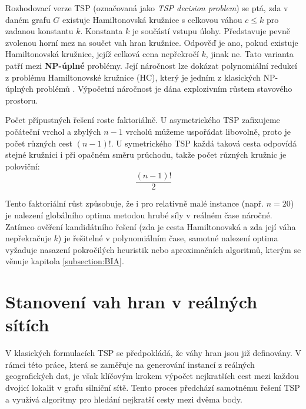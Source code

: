 Rozhodovací verze TSP (označovaná jako \textit{TSP decision problem}) se ptá, zda v daném grafu $G$ existuje Hamiltonovská kružnice s celkovou váhou $c \leq k$ pro zadanou konstantu $k$. Konstanta $k$ je součástí vstupu úlohy. Představuje pevně zvolenou horní mez na součet vah hran kružnice. Odpověď je ano, pokud existuje Hamiltonovská kružnice, jejíž celková cena nepřekročí $k$, jinak ne. Tato varianta patří mezi \textbf{NP-úplné} problémy. Její náročnost lze dokázat polynomiální redukcí z problému Hamiltonovské kružnice (HC), který je jedním z klasických NP-úplných problémů \cite{jancar_vsb_ti_skript,reinelt1994tsplib}.
Výpočetní náročnost je dána explozivním růstem stavového prostoru. 

Počet přípustných řešení roste faktoriálně. U asymetrického TSP zafixujeme počáteční vrchol a zbylých $n-1$ vrcholů můžeme uspořádat libovolně, proto je počet různých cest $(n-1)!$. U symetrického TSP každá taková cesta odpovídá stejné kružnici i při opačném směru průchodu, takže počet různých kružnic je poloviční:
\begin{equation}
    \frac{(n-1)!}{2}
\end{equation}
\begin{center}
  \footnotesize \cite{reinelt1994tsplib}
\end{center}
Tento faktoriální růst způsobuje, že i pro relativně malé instance (např. $n=20$) je nalezení globálního optima metodou hrubé síly v reálném čase náročné. Zatímco ověření kandidátního řešení (zda je cesta Hamiltonovská a zda její váha nepřekračuje $k$) je řešitelné v polynomiálním čase, samotné nalezení optima vyžaduje nasazení pokročilých heuristik nebo aproximačních algoritmů, kterým se věnuje kapitola \ref{subsection:BIA}.


\section{Stanovení vah hran v reálných sítích}
V klasických formulacích TSP se předpokládá, že váhy hran jsou již definovány. V rámci této práce, která se zaměřuje na generování instancí z reálných geografických dat, je však klíčovým krokem výpočet nejkratších cest mezi každou dvojicí lokalit v grafu silniční sítě. Tento proces předchází samotnému řešení TSP a využívá algoritmy pro hledání nejkratší cesty mezi dvěma body.

